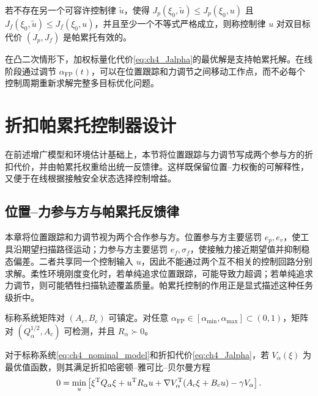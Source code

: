 \begin{definition}[帕累托有效控制律]
\label{def:ch4_pareto}
若不存在另一个可容许控制律 $\tilde u$，使得 $J_p(\xi_0,\tilde u)\le J_p(\xi_0,u)$ 且 $J_f(\xi_0,\tilde u)\le J_f(\xi_0,u)$，并且至少一个不等式严格成立，则称控制律 $u$ 对双目标代价 $(J_p,J_f)$ 是帕累托有效的。
\end{definition}

在凸二次情形下，加权标量化代价\eqref{eq:ch4_Jalpha}的最优解是支持帕累托解。在线阶段通过调节 $\alpha_{\mathrm{FP}}(t)$，可以在位置跟踪和力调节之间移动工作点，而不必每个控制周期重新求解完整多目标优化问题。


\section{折扣帕累托控制器设计}
\label{sec:ch4_game_controller}

在前述增广模型和环境估计基础上，本节将位置跟踪与力调节写成两个参与方的折扣代价，并由帕累托权重给出统一反馈律。这样既保留位置--力权衡的可解释性，又便于在线根据接触安全状态选择控制增益。

\subsection{位置--力参与方与帕累托反馈律}
\label{subsec:ch4_players}

本章将位置跟踪和力调节视为两个合作参与方。位置参与方主要惩罚 $e_p,e_v$，使工具沿期望扫描路径运动；力参与方主要惩罚 $e_f,\sigma_f$，使接触力接近期望值并抑制稳态偏差。二者共享同一个控制输入 $u$，因此不能通过两个互不相关的控制回路分别求解。柔性环境刚度变化时，若单纯追求位置跟踪，可能导致力超调；若单纯追求力调节，则可能牺牲扫描轨迹覆盖质量。帕累托控制的作用正是显式描述这种任务级折中。

\begin{assumption}[标称系统可镇定与可检测]
\label{ass:ch4_stabilizable}
标称系统矩阵对 $(A_c,B_c)$ 可镇定。对任意 $\alpha_{\mathrm{FP}}\in[\alpha_{\min},\alpha_{\max}]\subset(0,1)$，矩阵对 $(Q_\alpha^{1/2},A_c)$ 可检测，并且 $R_\alpha\succ0$。
\end{assumption}

\begin{lemma}
\label{lem:ch4_hjb}
对于标称系统\eqref{eq:ch4_nominal_model}和折扣代价\eqref{eq:ch4_Jalpha}，若 $V_\alpha(\xi)$ 为最优值函数，则其满足折扣哈密顿--雅可比--贝尔曼方程
\begin{equation}
  0=\min_u\left[\xi^{\mathrm{T}}Q_\alpha\xi+u^{\mathrm{T}}R_\alpha u+\nabla V_\alpha^{\mathrm{T}}(A_c\xi+B_cu)-\gamma V_\alpha\right].
  \label{eq:ch4_hjb}
\end{equation}
\end{lemma}

